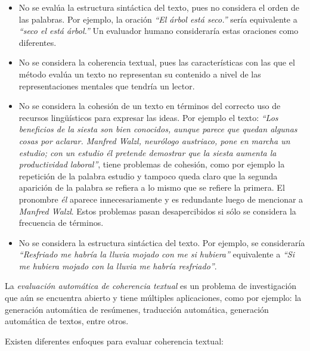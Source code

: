 \documentclass[12pt]{diicc}
\begin{document}
\begin{itemize}
	\item No se evalúa la estructura sintáctica del texto, pues no considera el orden de las palabras. Por ejemplo, la oración {\em ``El árbol está seco.''} sería equivalente a {\em ``seco el está árbol.''} Un evaluador humano consideraría estas oraciones como diferentes.
	\item No se considera la coherencia textual, pues las características con las que el método evalúa un texto no representan su contenido a nivel de las representaciones mentales que tendría un lector.
	\item No se considera la cohesión de un texto en términos del correcto uso de recursos lingüísticos para expresar las ideas. Por ejemplo el texto: {\em ``Los beneficios de la siesta son bien conocidos, aunque parece que quedan algunas cosas por aclarar. Manfred Walzl, neurólogo austriaco, pone en marcha un estudio; con un estudio él pretende demostrar que la siesta aumenta la productividad laboral''}, tiene problemas de cohesión, como por ejemplo la repetición de la palabra estudio y tampoco queda claro que la segunda aparición de la palabra se refiera a lo mismo que se refiere la primera. El pronombre {\em él} aparece innecesariamente y es redundante luego de mencionar a {\em Manfred Walzl}. Estos problemas pasan desapercibidos si sólo se considera la frecuencia de términos.
	\item No se considera la estructura sintáctica del texto. Por ejemplo, se consideraría {\em ``Resfriado me habría la lluvia mojado con me si hubiera''} equivalente a {\em ``Si me hubiera mojado con la lluvia me habría resfriado''}.
	
\end{itemize}

La {\em evaluación automática de coherencia textual} es un problema de investigación que aún se encuentra abierto y tiene múltiples aplicaciones, como por ejemplo: la generación automática de resúmenes, traducción automática, generación automática de textos, entre otros\cite{t33}\cite{t34}\cite{t35}. 

Existen diferentes enfoques para evaluar coherencia textual: 
\end{document}
